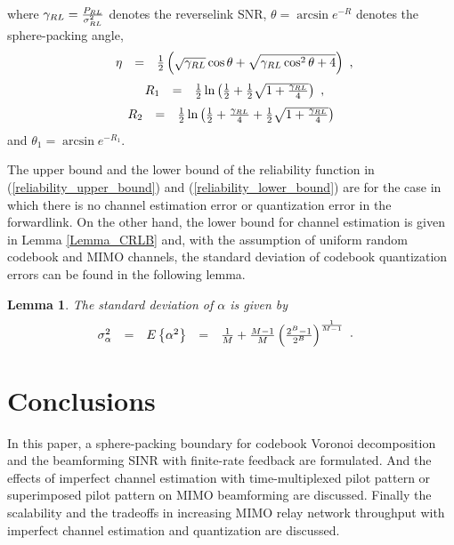 \documentclass[10pt,fleqn, twocolumn]{IEEEtran}
\newtheorem{lemma}{Lemma}
\begin{document}
\noindent where $\gamma_{\mbox{\tiny RL}}=\frac{P_{\mbox{\tiny
RL}}}{\sigma^2_{\mbox{\tiny RL}}}$ denotes the reverselink SNR,
$\theta=\arcsin e^{-R}$ denotes the sphere-packing angle,
\begin{equation}\hspace{-0.0in}
\begin{array}{rcl}
\eta&=&\frac{1}{2}\left(\sqrt{\gamma_{\mbox{\tiny
RL}}}\cos\theta+\sqrt{\gamma_{\mbox{\tiny
RL}}\cos^2\theta+4}\right)
\end{array},
\end{equation}
\begin{equation}\hspace{-0.0in}
\begin{array}{rcl}
R_{1}&=&\frac{1}{2}\ln\left(\frac{1}{2}+\frac{1}{2}\sqrt{1+\frac{\gamma_{\mbox{\tiny
RL}}}{4}}\right)
\end{array},
\end{equation}
\begin{equation}\hspace{-0.0in}
\begin{array}{rcl}
R_{2}&=&\frac{1}{2}\ln\left(\frac{1}{2}+\frac{\gamma_{\mbox{\tiny
RL}}}{4}+\frac{1}{2}\sqrt{1+\frac{\gamma_{\mbox{\tiny
RL}}}{4}}\right)
\end{array}
\end{equation}
\noindent and $\theta_{1}=\arcsin e^{-R_{1}}$.

The upper bound and the lower bound of the reliability function in
(\ref{reliability_upper_bound}) and
(\ref{reliability_lower_bound}) are for the case in which there is
no channel estimation error or quantization error in the
forwardlink. On the other hand, the lower bound for channel
estimation is given in Lemma \ref{Lemma_CRLB} and, with the
assumption of uniform random codebook and MIMO channels, the
standard deviation of codebook quantization errors can be found in
the following lemma.
\begin{lemma} The standard deviation
of $\alpha$ is given by
\begin{equation}\hspace{-0.2in}
\begin{array}{rcccl}
\sigma_{\alpha}^2&=&\mbox{E}\left\{\alpha^2\right\}&=&\frac{1}{M}+\frac{M-1}{M}\left(\frac{2^B-1}{2^B}\right)^{\frac{1}{M-1}}
\end{array}.\label{sigma_alpha}
\end{equation}
\end{lemma}

\section{Conclusions}
In this paper, a sphere-packing boundary for codebook Voronoi
decomposition and the beamforming SINR with finite-rate feedback
are formulated. And the effects of imperfect channel estimation
with time-multiplexed pilot pattern or superimposed pilot pattern
on MIMO beamforming are discussed. Finally the scalability and the
tradeoffs in increasing MIMO relay network throughput with
imperfect channel estimation and quantization are discussed.

\small


\end{document}
